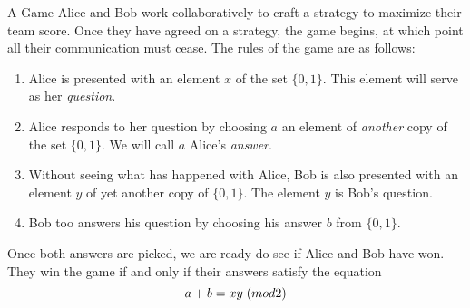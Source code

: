 \documentclass[handout, 10 pt]{beamer}
\begin{document}
\begin{frame}{A Game}
Alice and Bob work collaboratively to craft a strategy to maximize their team score.  Once they have agreed on a strategy, the game begins, at which point all their communication must cease.  The rules of the game are as follows:
\pause
\begin{enumerate}
\item Alice is presented with an element $x$ of the set $\{0,1\}$.  This element will serve as her {\emph{question}}.
\pause
\item Alice responds to her question by choosing $a$ an element of {\emph{another}} copy of the set $\{0,1\}$.  We will call $a$ Alice's {\emph{answer}}. \pause
\item Without seeing what has happened with Alice, Bob is also presented with an element $y$ of yet another copy of $\{0,1\}$. The element $y$ is Bob's question.
\pause
\item Bob too answers his question by choosing his answer $b$ from $\{0,1\}$.
\end{enumerate}
\pause
Once both answers are picked, we are ready do see if Alice and Bob have won.  They win the game if and only if their answers satisfy the equation
\begin{equation*}
 a+b =xy\hspace{.1cm}(mod 2) 
\end{equation*}
\end{frame}
\end{document}
